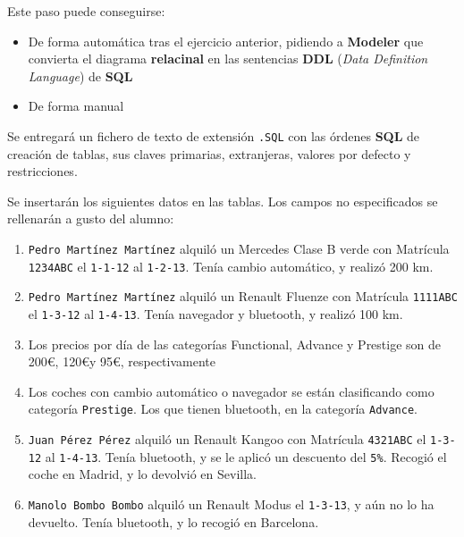 \begin{homeworkProblem}
  Este paso puede conseguirse:
  \begin{itemize}
  \item De forma automática tras el ejercicio anterior, pidiendo a \textbf{Modeler} que convierta el diagrama \textbf{relacinal} en las sentencias \textbf{DDL} (\textit{Data Definition Language}) de \textbf{SQL}
  \item De forma manual
  \end{itemize}

  Se entregará un fichero de texto de extensión \texttt{.SQL} con las órdenes \textbf{SQL} de creación de tablas, sus claves primarias, extranjeras, valores por defecto y restricciones.

\end{homeworkProblem}



\begin{homeworkProblem}
  Se insertarán los siguientes datos en las tablas. Los campos no especificados se
  rellenarán a gusto del alumno:

  \begin{enumerate}
  \item  \texttt{Pedro Martínez Martínez} alquiló un Mercedes Clase B verde con
    Matrícula \texttt{1234ABC} el \texttt{1-1-12} al \texttt{1-2-13}. Tenía cambio automático, y
    realizó 200 km.
  \item  \texttt{Pedro Martínez Martínez} alquiló un Renault Fluenze con Matrícula
    \texttt{1111ABC} el \texttt{1-3-12} al \texttt{1-4-13}. Tenía navegador y bluetooth, y realizó
    100 km.
  \item  Los precios por día de las categorías Functional, Advance y Prestige
    son de 200\euro, 120\euro y 95\euro, respectivamente

  \item  Los coches con cambio automático o navegador se están clasificando
    como categoría \texttt{Prestige}. Los que tienen bluetooth, en la categoría
    \texttt{Advance}.
  \item  \texttt{Juan Pérez Pérez} alquiló un Renault Kangoo con Matrícula \texttt{4321ABC} el
    \texttt{1-3-12} al \texttt{1-4-13}. Tenía bluetooth, y se le aplicó un descuento del \texttt{5\%}.
    Recogió el coche en Madrid, y lo devolvió en Sevilla.
  \item  \texttt{Manolo Bombo Bombo} alquiló un Renault Modus el \texttt{1-3-13}, y aún no lo
    ha devuelto. Tenía bluetooth, y lo recogió en Barcelona.
  \end{enumerate}
\end{homeworkProblem}


